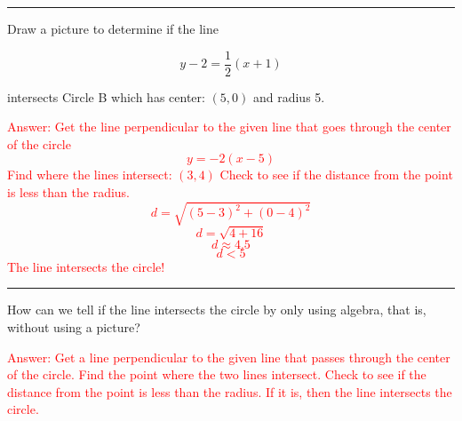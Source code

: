 \documentclass[a4paper,10pt]{article} %
\newcommand\answer[1]{ \iffoo \textcolor{red}{#1} \fi }
\let\iffoo\iffalse
\begin{document}
\vspace{6cm}

\hrule

Draw a picture to determine if the line

$$y-2 = \frac{1}{2}(x+1)$$

intersects Circle B which has center: $(5, 0)$ and radius 5.

\answer{Answer: 
Get the line perpendicular to the given line that goes through the center of the circle
$$y = -2(x-5)$$
Find where the lines intersect: $(3,4)$
Check to see if the distance from the point is less than the radius.
$$d = \sqrt{(5-3)^2 + (0-4)^2}$$
$$d = \sqrt{4 + 16}$$
$$d \approx 4.5$$
$$d < 5$$
The line intersects the circle!}

\vspace{6cm}

\hrule

How can we tell if the line intersects the circle by only using algebra, that is, without using a picture?

\answer{Answer: 
Get a line perpendicular to the given line that passes through the center of the circle.
Find the point where the two lines intersect.
Check to see if the distance from the point is less than the radius.
If it is, then the line intersects the circle.}
\end{document}

